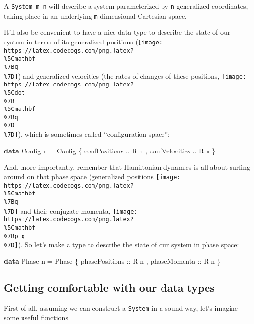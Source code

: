 \documentclass[]{article}
\newenvironment{Shaded}{}{}
\newcommand{\KeywordTok}[1]{\textcolor[rgb]{0.00,0.44,0.13}{\textbf{#1}}}
\newcommand{\DataTypeTok}[1]{\textcolor[rgb]{0.56,0.13,0.00}{#1}}
\newcommand{\OtherTok}[1]{\textcolor[rgb]{0.00,0.44,0.13}{#1}}
\newcommand{\FunctionTok}[1]{\textcolor[rgb]{0.02,0.16,0.49}{#1}}
\newcommand{\NormalTok}[1]{#1}
\begin{document}
A \texttt{System\ m\ n} will describe a system parameterized by \texttt{n}
generalized coordinates, taking place in an underlying \texttt{m}-dimensional
Cartesian space.

It'll also be convenient to have a nice data type to describe the state of our
system in terms of its generalized positions
(\texttt{[image: https://latex.codecogs.com/png.latex?\\\%5Cmathbf\\\%7Bq\\\%7D]}) and
generalized velocities (the rates of changes of these positions,
\texttt{[image: https://latex.codecogs.com/png.latex?\\\%5Cdot\\\%7B\\\%5Cmathbf\\\%7Bq\\\%7D\\\%7D]}),
which is sometimes called ``configuration space'':

\begin{Shaded}
\begin{Highlighting}[]
\KeywordTok{data} \DataTypeTok{Config}\NormalTok{ n }\FunctionTok{=} \DataTypeTok{Config}
\NormalTok{    \{}\OtherTok{ confPositions  ::} \DataTypeTok{R}\NormalTok{ n}
\NormalTok{    ,}\OtherTok{ confVelocities ::} \DataTypeTok{R}\NormalTok{ n}
\NormalTok{    \}}
\end{Highlighting}
\end{Shaded}

And, more importantly, remember that Hamiltonian dynamics is all about surfing
around on that phase space (generalized positions
\texttt{[image: https://latex.codecogs.com/png.latex?\\\%5Cmathbf\\\%7Bq\\\%7D]} and
their conjugate momenta,
\texttt{[image: https://latex.codecogs.com/png.latex?\\\%5Cmathbf\\\%7Bp\_q\\\%7D]}).
So let's make a type to describe the state of our system in phase space:

\begin{Shaded}
\begin{Highlighting}[]
\KeywordTok{data} \DataTypeTok{Phase}\NormalTok{ n }\FunctionTok{=} \DataTypeTok{Phase}
\NormalTok{    \{}\OtherTok{ phasePositions ::} \DataTypeTok{R}\NormalTok{ n}
\NormalTok{    ,}\OtherTok{ phaseMomenta   ::} \DataTypeTok{R}\NormalTok{ n}
\NormalTok{    \}}
\end{Highlighting}
\end{Shaded}

\subsection{Getting comfortable with our data
types}\label{getting-comfortable-with-our-data-types}

First of all, assuming we can construct a \texttt{System} in a sound way, let's
imagine some useful functions.
\end{document}
